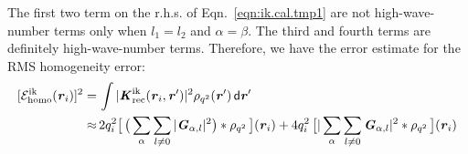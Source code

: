 \documentclass[aps,pre,preprint]{revtex4}
\renewcommand{\v}[1]{\textbf{\textit{#1}}}
\renewcommand{\d}[1]{\textsf{#1}}
\begin{document}
The first two term on the r.h.s. of Eqn.~\eqref{eqn:ik.cal.tmp1}
are not high-wave-number terms only when $l_1 = l_2$ and $\alpha=\beta$.
The third and fourth terms are definitely high-wave-number terms.
Therefore, we have the error estimate
for the RMS homogeneity error:
\begin{align}\nonumber
  [\mathcal E^{\textrm{ik}}_{\textrm{homo}}(\v r_i)]^2
  = \,&
  \int
  \vert\v K^{\textrm{ik}}_{\textrm{rec}}(\v r_i,\v r')\vert^2
  \rho_{q^2}(\v r')\,\d d\v r' \\
  \approx\,&  
  2q_i^2
  \big[\,
  \big(
  \sum_{\alpha} \sum_{l\neq 0}
  \vert \v G_{\alpha,l}\vert^2
  \big)
  \ast \rho_{q^2}
  \,\big] (\v r_i)
  +
  4q_i^2\,
  \big[
  \vert
  \sum_{\alpha} \sum_{l\neq 0}  
  \v G_{\alpha,l}
  \vert^2
  \ast \rho_{q^2}\,
  \big] (\v r_i) 
\end{align}
\end{document}
